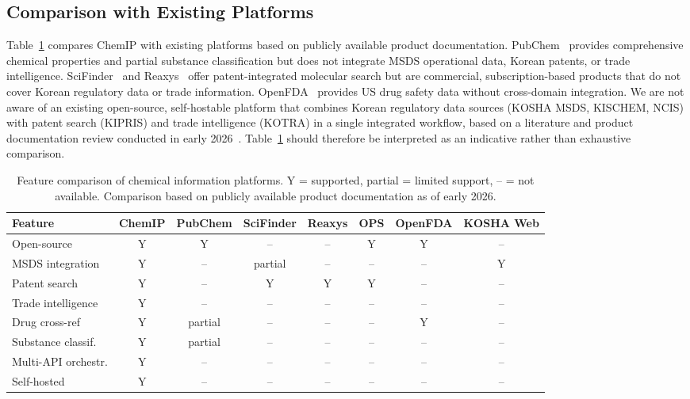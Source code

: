 \documentclass[preprint,12pt]{elsarticle}
\begin{document}
\subsection{Comparison with Existing Platforms}

Table~\ref{tab:comparison} compares ChemIP with existing platforms based on publicly available product documentation. PubChem~\cite{pubchem2023} provides comprehensive chemical properties and partial substance classification but does not integrate MSDS operational data, Korean patents, or trade intelligence. SciFinder~\cite{scifinder2024} and Reaxys~\cite{reaxys2024} offer patent-integrated molecular search but are commercial, subscription-based products that do not cover Korean regulatory data or trade information. OpenFDA~\cite{openfda2024} provides US drug safety data without cross-domain integration. We are not aware of an existing open-source, self-hostable platform that combines Korean regulatory data sources (KOSHA MSDS, KISCHEM, NCIS) with patent search (KIPRIS) and trade intelligence (KOTRA) in a single integrated workflow, based on a literature and product documentation review conducted in early 2026~\cite{pubchem2023,scifinder2024,reaxys2024,openfda2024}. Table~\ref{tab:comparison} should therefore be interpreted as an indicative rather than exhaustive comparison.

\begin{table}[htbp]
\centering
\caption{Feature comparison of chemical information platforms. Y = supported, partial = limited support, -- = not available. Comparison based on publicly available product documentation as of early 2026.}
\label{tab:comparison}
\begin{tabular}{@{}lccccccc@{}}
\toprule
Feature & ChemIP & PubChem & SciFinder & Reaxys & OPS & OpenFDA & KOSHA Web \\
\midrule
Open-source        & Y & Y       & --        & --     & Y   & Y       & --        \\
MSDS integration   & Y & --      & partial   & --     & --  & --      & Y         \\
Patent search      & Y & --      & Y         & Y      & Y   & --      & --        \\
Trade intelligence & Y & --      & --        & --     & --  & --      & --        \\
Drug cross-ref     & Y & partial & --        & --     & --  & Y       & --        \\
Substance classif. & Y & partial & --        & --     & --  & --      & --        \\
Multi-API orchestr.& Y & --      & --        & --     & --  & --      & --        \\
Self-hosted        & Y & --      & --        & --     & --  & --      & --        \\
\bottomrule
\end{tabular}
\end{table}
\end{document}

